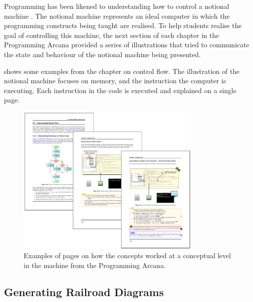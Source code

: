 
Programming has been likened to understanding how to control a notional machine \cite{DuBoulay:1986}. The notional machine represents an ideal computer in which the programming constructs being taught are realised. To help students realise the goal of controlling this machine, the next section of each chapter in the Programming Arcana provided a series of illustrations that tried to communicate the state and behaviour of the notional machine being presented. 

 shows some examples from the chapter on control flow. The illustration of the notional machine focuses on memory, and the instruction the computer is executing. Each instruction in the code is executed and explained on a single page.

\begin{figure}[h]
  \centering
  \includegraphics[width=0.8\textwidth]{ArcanaUnderstand}
  \caption{Examples of pages on how the concepts worked at a conceptual level in the machine from the Programming Arcana.}
  \label{fig:arcana_understanding}
\end{figure}

\clearpage





\subsection{Generating Railroad Diagrams} %
\label{ssub:railroad_diagrams}

